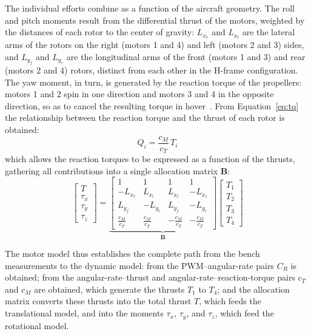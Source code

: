 \documentclass{ieeeaccess}
\begin{document}
The individual efforts combine as a function of the aircraft geometry. The roll and pitch moments result from the differential thrust of the motors, weighted by the distances of each rotor to the center of gravity: $L_{x_r}$ and $L_{x_l}$ are the lateral arms of the rotors on the right (motors 1 and 4) and left (motors 2 and 3) sides, and $L_{y_f}$ and $L_{y_r}$ are the longitudinal arms of the front (motors 1 and 3) and rear (motors 2 and 4) rotors, distinct from each other in the H-frame configuration. The yaw moment, in turn, is generated by the reaction torque of the propellers: motors 1 and 2 spin in one direction and motors 3 and 4 in the opposite direction, so as to cancel the resulting torque in hover~\cite{c5}. From Equation~\eqref{eq:tq} the relationship between the reaction torque and the thrust of each rotor is obtained:
\begin{equation}
Q_i = \frac{c_M}{c_T}\,T_i
\label{eq:qt-ratio}
\end{equation}
which allows the reaction torques to be expressed as a function of the thrusts, gathering all contributions into a single allocation matrix $\mathbf{B}$:
\begin{equation}
\begin{bmatrix} T \\ \tau_x \\ \tau_y \\ \tau_z \end{bmatrix}
=
\underbrace{\begin{bmatrix}
1 & 1 & 1 & 1 \\
-L_{x_r} & L_{x_l} & L_{x_l} & -L_{x_r} \\
L_{y_f} & -L_{y_r} & L_{y_f} & -L_{y_r} \\
\tfrac{c_M}{c_T} & \tfrac{c_M}{c_T} & -\tfrac{c_M}{c_T} & -\tfrac{c_M}{c_T}
\end{bmatrix}}_{\mathbf{B}}
\begin{bmatrix} T_1 \\ T_2 \\ T_3 \\ T_4 \end{bmatrix}
\label{eq:aloca}
\end{equation}

The motor model thus establishes the complete path from the bench measurements to the dynamic model: from the PWM--angular-rate pairs $C_R$ is obtained; from the angular-rate--thrust and angular-rate--reaction-torque pairs $c_T$ and $c_M$ are obtained, which generate the thrusts $T_1$ to $T_4$; and the allocation matrix converts these thrusts into the total thrust $T$, which feeds the translational model, and into the moments $\tau_x$, $\tau_y$, and $\tau_z$, which feed the rotational model.
\end{document}
